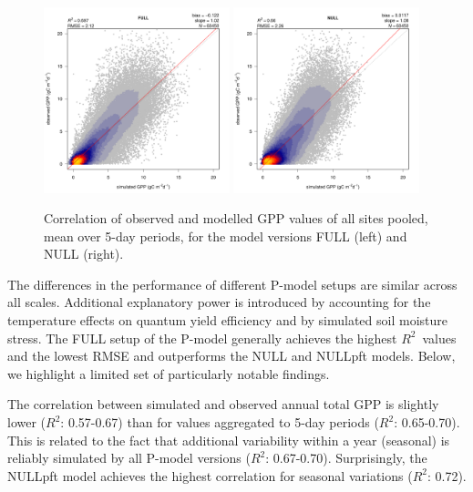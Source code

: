 \documentclass{myreport}
\newcommand{\rsq}{$R^2$}
\begin{document}
\begin{figure}[!ht]
    \centering
    \includegraphics[width=0.48\textwidth]{fig/modobs_xdaily_FULL.pdf}
    \includegraphics[width=0.48\textwidth]{fig/modobs_xdaily_NULL.pdf}
    \caption{Correlation of observed and modelled GPP values of all sites pooled, mean over 5-day periods, for the model versions FULL (left) and NULL (right).}
    \label{fig:modobs_xdaily}
\end{figure}

The differences in the performance of different P-model setups are similar across all scales. Additional explanatory power is introduced by accounting for the temperature effects on quantum yield efficiency and by simulated soil moisture stress. The FULL setup of the P-model generally achieves the highest \rsq\ values and the lowest RMSE and outperforms the NULL and NULLpft models. Below, we highlight a limited set of particularly notable findings.

The correlation between simulated and observed annual total GPP is slightly lower (\rsq : 0.57-0.67) than for values aggregated to 5-day periods (\rsq : 0.65-0.70). This is related to the fact that additional variability within a year (seasonal) is reliably simulated by all P-model versions (\rsq : 0.67-0.70). Surprisingly, the NULLpft model achieves the highest correlation for seasonal variations (\rsq : 0.72).
\end{document}
